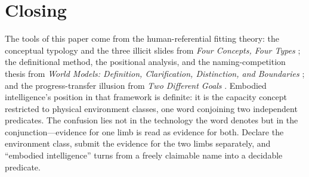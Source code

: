 \documentclass[10pt]{article}
\begin{document}
\section{Closing}\label{sec:closing}

The tools of this paper come from the human-referential fitting theory: the conceptual typology and the three illicit slides from \textit{Four Concepts, Four Types} \cite{yu2026four}; the definitional method, the positional analysis, and the naming-competition thesis from \textit{World Models: Definition, Clarification, Distinction, and Boundaries} \cite{yu2026wm}; and the progress-transfer illusion from \textit{Two Different Goals} \cite{yu2026two}. Embodied intelligence's position in that framework is definite: it is the capacity concept restricted to physical environment classes, one word conjoining two independent predicates. The confusion lies not in the technology the word denotes but in the conjunction---evidence for one limb is read as evidence for both. Declare the environment class, submit the evidence for the two limbs separately, and ``embodied intelligence'' turns from a freely claimable name into a decidable predicate.
\end{document}
